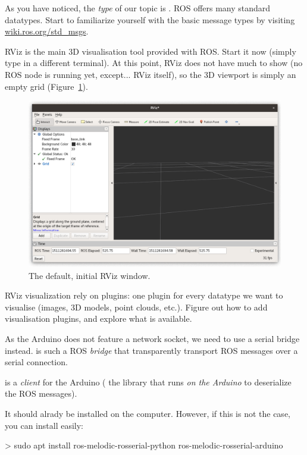 \documentclass{instructions}
\begin{document}
As you have noticed, the \emph{type} of our  topic is
. ROS offers many standard datatypes. Start to familiarize
yourself with the basic message types by visiting
\href{http://wiki.ros.org/std_msgs}{wiki.ros.org/std\_msgs}.


RViz is the main 3D visualisation tool provided with ROS. Start it now (simply
type  in a different terminal). At this point, RViz does not have much to
show (no ROS node is running yet, except... RViz itself), so the 3D viewport is
simply an empty grid (Figure~\ref{rviz}).

\begin{figure}[h!]
    \centering
    \includegraphics[width=0.7\linewidth]{rviz}
    \caption{The default, initial RViz window.}
    \label{rviz}
\end{figure}

RViz visualization rely on plugins: one plugin for every datatype we want to
visualise (images, 3D models, point clouds, etc.). Figure out how to add
visualisation plugins, and explore what is available.


As the Arduino does not feature a network socket, we need to use a serial bridge
instead.   is such a ROS \emph{bridge} that transparently
transport ROS messages over a serial connection.

 is a  \emph{client} for the Arduino (\ie
the library that runs \emph{on the Arduino} to deserialize the ROS messages).

It should alrady be installed on the computer. However, if this is not the case,
you can install  easily:

\begin{shcode}
> sudo apt install ros-melodic-rosserial-python ros-melodic-rosserial-arduino
\end{shcode}
\end{document}
